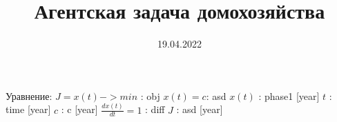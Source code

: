 \documentclass{a_model}
\title{Агентская задача домохозяйства}
\date{19.04.2022}
\begin{document}
Уравнение:
    $ J = x(t) -> min$ : obj
    $x(t) = c $: asd
    $x(t)$ : phase1 [year]
    $t$ : time [year]
    $c$ : c [year]
    $\frac{dx(t)}{dt} = 1$ : diff
    $J$ : asd [year]
\end{document}
